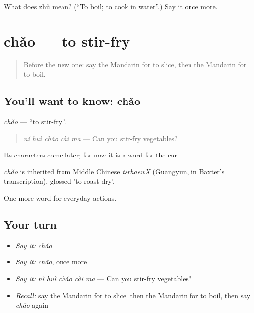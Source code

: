 \begin{tcolorbox}[breakable,colback=teal!4,colframe=teal!35!black,title={Before you move on}]
What does zhǔ mean? (\textquotedblleft{}To boil; to cook in water\textquotedblright{}.) Say it once more.
\end{tcolorbox}
\section[chǎo]{chǎo — to stir-fry}

\label{lesson:ZH-C113-chao}



\begin{quote}
Before the new one: say the Mandarin for to slice, then the Mandarin for to boil.
\end{quote}

\subsection*{You'll want to know: chǎo}
\emph{chǎo} — \textquotedblleft{}to stir-fry\textquotedblright{}.

\begin{quote}
\emph{nǐ huì chǎo cài ma} — Can you stir-fry vegetables?
\end{quote}

Its characters come later; for now it is a word for the ear.

\begin{cousinweb}
\emph{chǎo} is inherited from Middle Chinese \emph{tsrhaewX} (Guangyun, in Baxter's transcription), glossed 'to roast dry'.
\end{cousinweb}

\begin{grammarlens}[title={What you've built}]
One more word for everyday actions.
\end{grammarlens}

\subsection*{Your turn}
\begin{itemize}
\raggedright
  \item \emph{Say it:} \emph{chǎo}
  \item \emph{Say it:} \emph{chǎo}, once more
  \item \emph{Say it:} \emph{nǐ huì chǎo cài ma} — Can you stir-fry vegetables?
  \item \emph{Recall:} say the Mandarin for to slice, then the Mandarin for to boil, then say \emph{chǎo} again
\end{itemize}

